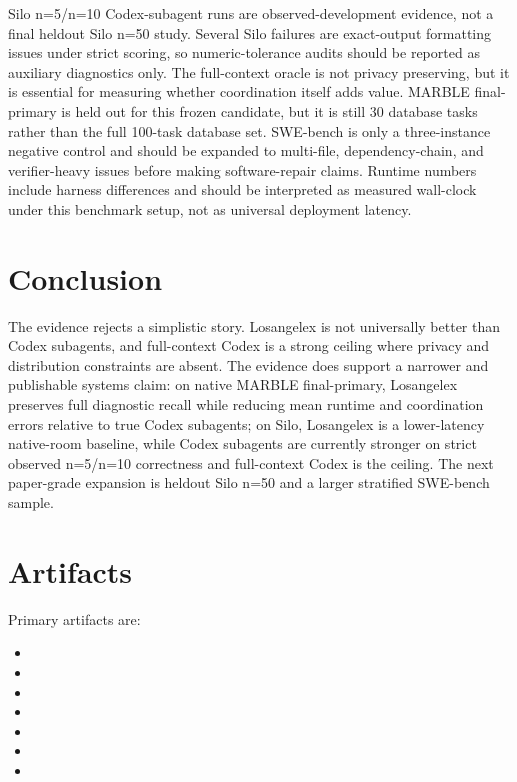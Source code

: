 \documentclass[10pt,twocolumn]{article}
\begin{document}
Silo n=5/n=10 Codex-subagent runs are observed-development evidence, not a final heldout Silo n=50 study. Several Silo failures are exact-output formatting issues under strict scoring, so numeric-tolerance audits should be reported as auxiliary diagnostics only. The full-context oracle is not privacy preserving, but it is essential for measuring whether coordination itself adds value. MARBLE final-primary is held out for this frozen candidate, but it is still 30 database tasks rather than the full 100-task database set. SWE-bench is only a three-instance negative control and should be expanded to multi-file, dependency-chain, and verifier-heavy issues before making software-repair claims. Runtime numbers include harness differences and should be interpreted as measured wall-clock under this benchmark setup, not as universal deployment latency.

\section{Conclusion}

The evidence rejects a simplistic story. Losangelex is not universally better than Codex subagents, and full-context Codex is a strong ceiling where privacy and distribution constraints are absent. The evidence does support a narrower and publishable systems claim: on native MARBLE final-primary, Losangelex preserves full diagnostic recall while reducing mean runtime and coordination errors relative to true Codex subagents; on Silo, Losangelex is a lower-latency native-room baseline, while Codex subagents are currently stronger on strict observed n=5/n=10 correctness and full-context Codex is the ceiling. The next paper-grade expansion is heldout Silo n=50 and a larger stratified SWE-bench sample.

\section*{Artifacts}

Primary artifacts are:
\footnotesize
\begin{itemize}
\item {}
\item {}
\item {}
\item {}
\item {}
\item {}
\item {}
\end{itemize}
\normalsize
\end{document}
